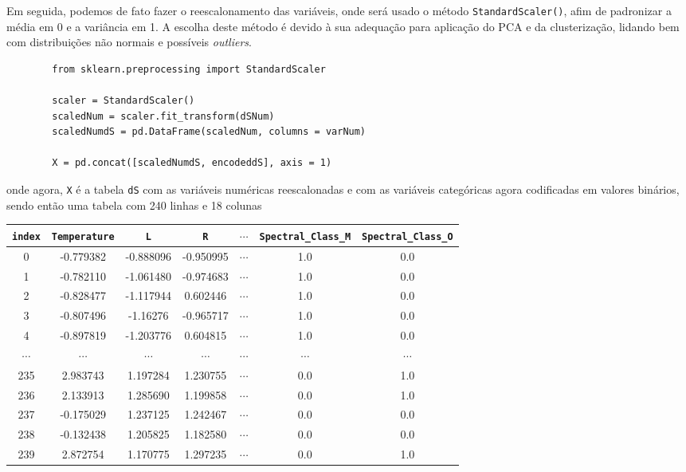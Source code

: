 Em seguida, podemos de fato fazer o reescalonamento das variáveis, onde será usado o método \verb|StandardScaler()|, afim de padronizar a média em 0 e a variância em 1. A escolha deste método é devido à sua adequação para aplicação do PCA e da clusterização, lidando bem com distribuições não normais e possíveis \textit{outliers}.
\begin{longlisting}
    \begin{verbatim}
        from sklearn.preprocessing import StandardScaler
        
        scaler = StandardScaler()
        scaledNum = scaler.fit_transform(dSNum)
        scaledNumdS = pd.DataFrame(scaledNum, columns = varNum)
        
        X = pd.concat([scaledNumdS, encodeddS], axis = 1)
    \end{verbatim}
\end{longlisting}
onde agora, \verb|X| é a tabela \verb|dS| com as variáveis numéricas reescalonadas e com as variáveis categóricas agora codificadas em valores binários, sendo então uma tabela com 240 linhas e 18 colunas
\begin{table}[H]
    \centering
    \begin{tabular}{ccccccc}
        \toprule
        \verb|index| & \verb|Temperature| & \verb|L| & \verb|R| & $\cdots$ & \verb|Spectral_Class_M| & \verb|Spectral_Class_O|  \\ 
        \midrule
        0 & -0.779382 & -0.888096 & -0.950995 & $\cdots$ & 1.0 & 0.0 \\
        1 & -0.782110 & -1.061480 & -0.974683 & $\cdots$ & 1.0 & 0.0 \\
        2 & -0.828477 & -1.117944 & 0.602446 & $\cdots$ & 1.0 & 0.0 \\
        3 & -0.807496 & -1.16276 & -0.965717 & $\cdots$ & 1.0 & 0.0 \\
        4 & -0.897819 & -1.203776 & 0.604815 & $\cdots$ & 1.0 & 0.0 \\
        $\cdots$ & $\cdots$ & $\cdots$ & $\cdots$ & $\cdots$ & $\cdots$ & $\cdots$ \\
        235 & 2.983743 & 1.197284 & 1.230755 & $\cdots$ & 0.0 & 1.0 \\
        236 & 2.133913 & 1.285690 & 1.199858 & $\cdots$ & 0.0 & 1.0 \\
        237 & -0.175029 & 1.237125 & 1.242467 & $\cdots$ & 0.0 & 0.0 \\
        238 & -0.132438 & 1.205825 & 1.182580 & $\cdots$ & 0.0 & 0.0 \\
        239 & 2.872754 & 1.170775 & 1.297235 & $\cdots$ & 0.0 & 1.0 \\
        \bottomrule
    \end{tabular}
\end{table}

